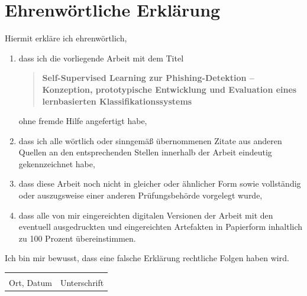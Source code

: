 \clearpage
\chapter*{Ehrenwörtliche Erklärung}
Hiermit erkläre ich ehrenwörtlich,
\begin{enumerate}
\item dass ich die vorliegende Arbeit mit dem Titel
\begin{quote}\textbf{Self-Supervised Learning zur Phishing-Detektion -- Konzeption, prototypische Entwicklung und Evaluation eines lernbasierten Klassifikationssystems}\end{quote}
ohne fremde Hilfe angefertigt habe,
\item dass ich alle wörtlich oder sinngemäß übernommenen Zitate aus anderen Quellen an den entsprechenden Stellen innerhalb der Arbeit eindeutig gekennzeichnet habe,
\item dass diese Arbeit noch nicht in gleicher oder ähnlicher Form sowie vollständig oder auszugsweise einer anderen Prüfungsbehörde vorgelegt wurde,
\item dass alle von mir eingereichten digitalen Versionen der Arbeit mit den eventuell ausgedruckten und eingereichten Artefakten in Papierform inhaltlich zu 100 Prozent übereinstimmen.
\end{enumerate}
Ich bin mir bewusst, dass eine falsche Erklärung rechtliche Folgen haben wird.
\vspace{2cm}

\noindent\begin{tabularx}{\textwidth}{@{}X X@{}}\hrulefill & \hrulefill\\ Ort, Datum & Unterschrift\end{tabularx}
